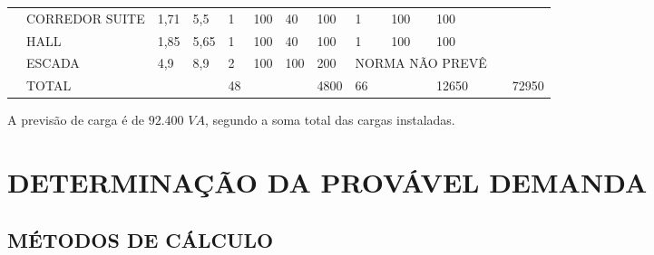 \begin{table}[H]
{\begin{tabular}{|l|l|ll|llll|lll|ll|}
		& CORREDOR SUITE               & \multicolumn{1}{l|}{1,71}                   & 5,5                    & \multicolumn{1}{l|}{1}                  & \multicolumn{1}{l|}{100}                  & \multicolumn{1}{l|}{40}                   & 100                  & \multicolumn{1}{l|}{1}                  & \multicolumn{1}{l|}{100}                  & 100                   & \multicolumn{1}{l|}{}                     &          \\ \cline{2-13} 
		& HALL                         & \multicolumn{1}{l|}{1,85}                   & 5,65                   & \multicolumn{1}{l|}{1}                  & \multicolumn{1}{l|}{100}                  & \multicolumn{1}{l|}{40}                   & 100                  & \multicolumn{1}{l|}{1}                  & \multicolumn{1}{l|}{100}                  & 100                   & \multicolumn{1}{l|}{}                     &          \\ \cline{2-13} 
		& ESCADA                       & \multicolumn{1}{l|}{4,9}                    & 8,9                    & \multicolumn{1}{l|}{2}                  & \multicolumn{1}{l|}{100}                  & \multicolumn{1}{l|}{100}                  & 200                  & \multicolumn{3}{l|}{NORMA NÃO PREVÊ}                                           & \multicolumn{1}{l|}{}                     &          \\ \hline
		& TOTAL                        & \multicolumn{1}{l|}{}                       &                        & \multicolumn{1}{l|}{48}                 & \multicolumn{1}{l|}{}                     & \multicolumn{1}{l|}{}                     & 4800                 & \multicolumn{1}{l|}{66}                 & \multicolumn{1}{l|}{}                     & 12650                 & \multicolumn{1}{l|}{}                     & 72950    \\ \hline
	\end{tabular}}
\end{table}

A previsão de carga é de $92.400$ $VA$, segundo a soma total das cargas instaladas.

\section{DETERMINAÇÃO DA PROVÁVEL DEMANDA}

\subsection{MÉTODOS DE CÁLCULO}

